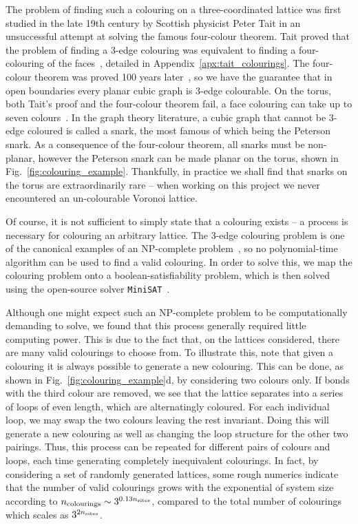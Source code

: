 The problem of finding such a colouring on a three-coordinated lattice was first studied in the late 19th century by Scottish physicist Peter Tait in an unsuccessful attempt at solving the famous four-colour theorem. Tait proved that the problem of finding a 3-edge colouring was equivalent to finding a four-colouring of the faces~\cite{tait_remarks_1880}, detailed in Appendix~\ref{apx:tait_colourings}. The four-colour theorem was proved 100 years later~\cite{appel_every_1989}, so we have the guarantee that in open boundaries every planar cubic graph is 3-edge colourable. On the torus, both Tait's proof and the four-colour theorem fail, a face colouring can take up to seven colours~\cite{ringel_solution_1968}. In the graph theory literature, a cubic graph that cannot be 3-edge coloured is called a snark, the most famous of which being the Peterson snark. As a consequence of the four-colour theorem, all snarks must be non-planar, however the Peterson snark can be made planar on the torus, shown in Fig.~\ref{fig:colouring_example}. Thankfully, in practice we shall find that snarks on the torus are extraordinarily rare -- when working on this project we never encountered an un-colourable Voronoi lattice. 

Of course, it is not sufficient to simply state that a colouring exists -- a process is necessary for colouring an arbitrary lattice. The 3-edge colouring problem is one of the canonical examples of an NP-complete problem~\cite{karp_reducibility_1972}, so no polynomial-time algorithm can be used to find a valid colouring. In order to solve this, we map the colouring problem onto a boolean-satisfiability problem, which is then solved using the open-source solver \texttt{MiniSAT}~\cite{ignatiev_pysat_2018}. 

Although one might expect such an NP-complete problem to be computationally demanding to solve, we found that this process generally required little computing power. This is due to the fact that, on the lattices considered, there are many valid colourings to choose from. To illustrate this, note that given a colouring it is always possible to generate a new colouring. This can be done, as shown in Fig.~\ref{fig:colouring_example}d, by considering two colours only. If bonds with the third colour are removed, we see that the lattice separates into a series of loops of even length, which are alternatingly coloured. For each individual loop, we may swap the two colours leaving the rest invariant. Doing this will generate a new colouring as well as changing the loop structure for the other two pairings. Thus, this process can be repeated for different pairs of colours and loops, each time generating completely inequivalent colourings. In fact, by considering a set of randomly generated lattices, some rough numerics indicate that the number of valid colourings grows with the exponential of system size according to $n_{\textup{colourings}} \sim 3^{0.13n_{\textup{sites}}}$, compared to the total number of colourings which scales as $3^{2n_{\textup{sites}}}$.

